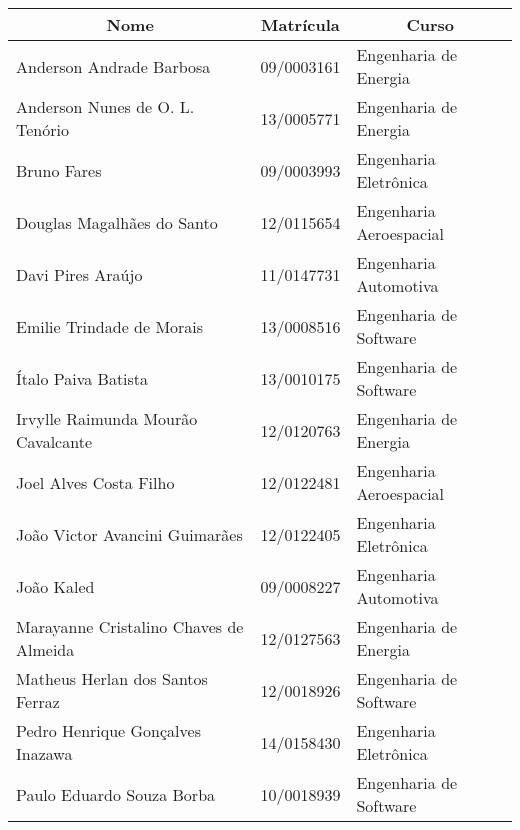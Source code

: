 \begin{resumo}[Autores]

\begin{table}[!h]
\centering
\label{my-label}
\begin{tabular}{|l|l|l|}
\hline
\multicolumn{1}{|c|}{\textbf{Nome}}    & \multicolumn{1}{c|}{\textbf{Matrícula}} & \multicolumn{1}{c|}{\textbf{Curso}} \\ \hline
Anderson Andrade Barbosa        & 09/0003161                              & Engenharia de Energia               \\ \hline
Anderson Nunes de O. L. Tenório               & 13/0005771                             & Engenharia de Energia               \\ \hline
Bruno Fares                            & 09/0003993                              & Engenharia Eletrônica               \\ \hline
Douglas Magalhães do Santo             & 12/0115654                              & Engenharia Aeroespacial             \\ \hline
Davi Pires Araújo                      & 11/0147731                              & Engenharia Automotiva               \\ \hline
Emilie Trindade de Morais              & 13/0008516                              & Engenharia de Software              \\ \hline
Ítalo Paiva Batista                    & 13/0010175                              & Engenharia de Software              \\ \hline
Irvylle Raimunda Mourão Cavalcante     & 12/0120763                              & Engenharia de Energia               \\ \hline
Joel Alves Costa Filho                 & 12/0122481                              & Engenharia Aeroespacial             \\ \hline
João Victor Avancini Guimarães         & 12/0122405                              & Engenharia Eletrônica               \\ \hline
João Kaled                             & 09/0008227                              & Engenharia Automotiva               \\ \hline
Marayanne Cristalino Chaves de Almeida & 12/0127563                              & Engenharia de Energia               \\ \hline
Matheus Herlan dos Santos Ferraz       & 12/0018926                              & Engenharia de Software              \\ \hline
Pedro Henrique Gonçalves Inazawa       & 14/0158430                              & Engenharia Eletrônica               \\ \hline
Paulo Eduardo Souza Borba              & 10/0018939                              & Engenharia de Software              \\ \hline
\end{tabular}
\end{table}

\end{resumo}
\pagebreak

